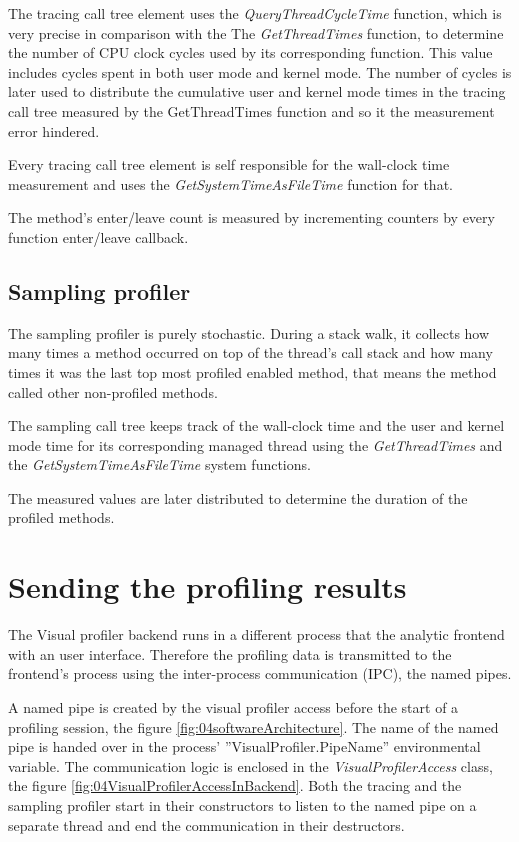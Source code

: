 The tracing call tree element uses the \textit{QueryThreadCycleTime} function, which is very precise in comparison with the The \textit{GetThreadTimes} function, to determine the number of CPU clock cycles used by its corresponding function. This value includes cycles spent in both user mode and kernel mode. The number of cycles is later used to distribute the cumulative user and kernel mode times in the tracing call tree measured by the GetThreadTimes function and so it the measurement error hindered.

Every tracing call tree element is self responsible for the wall-clock time measurement and uses the \textit{GetSystemTimeAsFileTime} function for that.

The method's enter/leave count is measured by incrementing counters by every function enter/leave callback.

\subsection{Sampling profiler}
The sampling profiler is purely stochastic. During a stack walk, it collects how many times a method occurred on top of the thread's call stack and how many times it was the last top most profiled enabled method, that means the method called other non-profiled methods.

The sampling call tree keeps track of the wall-clock time and the user and kernel mode time for its corresponding managed thread using the \textit{GetThreadTimes} and the \textit{GetSystemTimeAsFileTime} system functions.

The measured values are later distributed to determine the duration of the profiled methods.

\section{Sending the profiling results}
The Visual profiler backend runs in a different process that the analytic frontend with an user interface. Therefore the profiling data is transmitted to the frontend's process using the inter-process communication (IPC), the named pipes. 

A named pipe is created by the visual profiler access before the start of a profiling session, the figure \ref{fig:04softwareArchitecture}. The name of the named pipe is handed over in the process' ''VisualProfiler.PipeName'' environmental variable. The communication logic is enclosed in the \textit{VisualProfilerAccess} class, the figure \ref{fig:04VisualProfilerAccessInBackend}. Both the tracing and the sampling profiler start in their constructors to listen to the named pipe on a separate thread and end the communication in their destructors.


